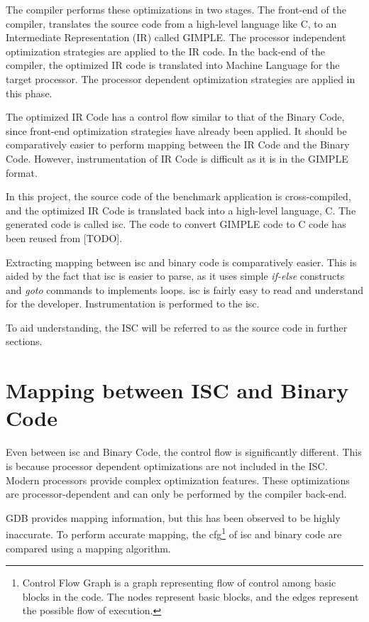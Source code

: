 The compiler performs these optimizations in two stages. The front-end of the compiler, translates the source code from a high-level language like C, to an Intermediate Representation (IR) called GIMPLE. The processor independent optimization strategies are applied to the IR code. In the back-end of the compiler, the optimized IR code is translated into Machine Language for the target processor. The processor dependent optimization strategies are applied in this phase.

The optimized IR Code has a control flow similar to that of the Binary Code, since front-end optimization strategies have already been applied. It should be comparatively easier to perform mapping between the IR Code and the Binary Code. However, instrumentation of IR Code is difficult as it is in the GIMPLE format. 

In this project, the source code of the benchmark application is cross-compiled, and the optimized IR Code is translated back into a high-level language, C. The generated code is called \gls{isc}. The code to convert GIMPLE code to C code has been reused from [TODO].

Extracting mapping between \gls{isc} and binary code is comparatively easier. This is aided by the fact that \gls{isc} is easier to parse, as it uses simple \emph{if-else} constructs and \emph{goto} commands to implements loops. \gls{isc} is fairly easy to read and understand for the developer. Instrumentation is performed to the \gls{isc}. 

To aid understanding, the ISC will be referred to as the source code in further sections.

\section{Mapping between ISC and Binary Code}
Even between \gls{isc} and Binary Code, the control flow is significantly different. This is because processor dependent optimizations are not included in the ISC. Modern processors provide complex optimization features. These optimizations are processor-dependent and can only be performed by the compiler back-end.

GDB provides mapping information, but this has been observed to be highly inaccurate. To perform accurate mapping, the \gls{cfg}\footnote{Control Flow Graph is a graph representing flow of control among basic blocks in the code. The nodes represent basic blocks, and the edges represent the possible flow of execution.} of \gls{isc} and binary code are compared using a mapping algorithm.

